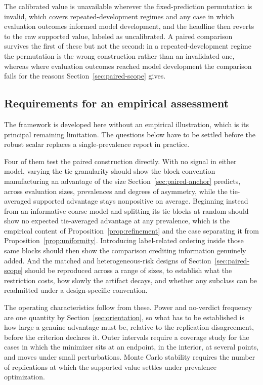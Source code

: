 \documentclass[11pt]{article}
\theoremstyle{remark}
\begin{document}
The calibrated value is unavailable wherever the fixed-prediction permutation is invalid, which covers repeated-development regimes and any case in which evaluation outcomes informed model development, and the headline then reverts to the raw supported value, labeled as uncalibrated. A paired comparison survives the first of these but not the second: in a repeated-development regime the permutation is the wrong construction rather than an invalidated one, whereas where evaluation outcomes reached model development the comparison fails for the reasons Section~\ref{sec:paired-scope} gives.


\subsection{Requirements for an empirical assessment}

The framework is developed here without an empirical illustration, which is its principal remaining limitation. The questions below have to be settled before the robust scalar replaces a single-prevalence report in practice.

Four of them test the paired construction directly. With no signal in either model, varying the tie granularity should show the block convention manufacturing an advantage of the size Section~\ref{sec:paired-anchor} predicts, across evaluation sizes, prevalences and degrees of asymmetry, while the tie-averaged supported advantage stays nonpositive on average. Beginning instead from an informative coarse model and splitting its tie blocks at random should show no expected tie-averaged advantage at any prevalence, which is the empirical content of Proposition~\ref{prop:refinement} and the case separating it from Proposition~\ref{prop:uniformity}. Introducing label-related ordering inside those same blocks should then show the comparison crediting information genuinely added. And the matched and heterogeneous-risk designs of Section~\ref{sec:paired-scope} should be reproduced across a range of sizes, to establish what the restriction costs, how slowly the artifact decays, and whether any subclass can be readmitted under a design-specific convention.

The operating characteristics follow from these. Power and no-verdict frequency are one quantity by Section~\ref{sec:orientation}, so what has to be established is how large a genuine advantage must be, relative to the replication disagreement, before the criterion declares it. Outer intervals require a coverage study for the cases in which the minimizer sits at an endpoint, in the interior, at several points, and moves under small perturbations. Monte Carlo stability requires the number of replications at which the supported value settles under prevalence optimization.
\end{document}
